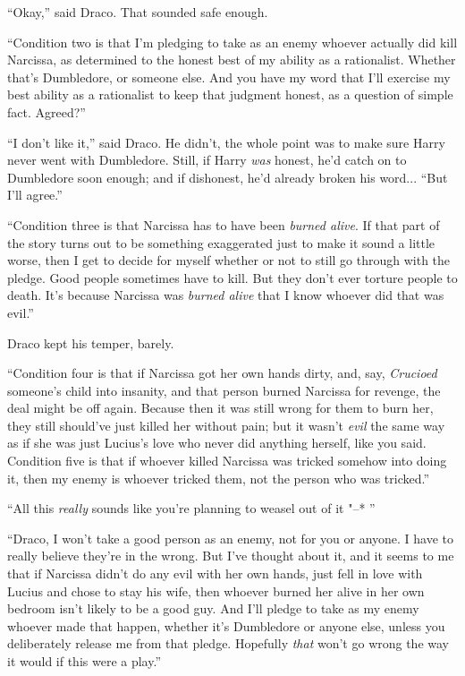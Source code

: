 ``Okay,'' said Draco. That sounded safe enough.

``Condition two is that I'm pledging to take as an enemy whoever
actually did kill Narcissa, as determined to the honest best of my
ability as a rationalist. Whether that's Dumbledore, or someone else.
And you have my word that I'll exercise my best ability as a rationalist
to keep that judgment honest, as a question of simple fact. Agreed?''

``I don't like it,'' said Draco. He didn't, the whole point was to make
sure Harry never went with Dumbledore. Still, if Harry \emph{was}
honest, he'd catch on to Dumbledore soon enough; and if dishonest, he'd
already broken his word... ``But I'll agree.''

``Condition three is that Narcissa has to have been \emph{burned alive}.
If that part of the story turns out to be something exaggerated just to
make it sound a little worse, then I get to decide for myself whether or
not to still go through with the pledge. Good people sometimes have to
kill. But they don't ever torture people to death. It's because Narcissa
was \emph{burned alive} that I know whoever did that was evil.''

Draco kept his temper, barely.

``Condition four is that if Narcissa got her own hands dirty, and, say,
\emph{Crucioed} someone's child into insanity, and that person burned
Narcissa for revenge, the deal might be off again. Because then it was
still wrong for them to burn her, they still should've just killed her
without pain; but it wasn't \emph{evil} the same way as if she was just
Lucius's love who never did anything herself, like you said. Condition
five is that if whoever killed Narcissa was tricked somehow into doing
it, then my enemy is whoever tricked them, not the person who was
tricked.''

``All this \emph{really} sounds like you're planning to weasel out of it
"--* ''

``Draco, I won't take a good person as an enemy, not for you or anyone. I
have to really believe they're in the wrong. But I've thought about it,
and it seems to me that if Narcissa didn't do any evil with her own
hands, just fell in love with Lucius and chose to stay his wife, then
whoever burned her alive in her own bedroom isn't likely to be a good
guy. And I'll pledge to take as my enemy whoever made that happen,
whether it's Dumbledore or anyone else, unless you deliberately release
me from that pledge. Hopefully \emph{that} won't go wrong the way it
would if this were a play.''

